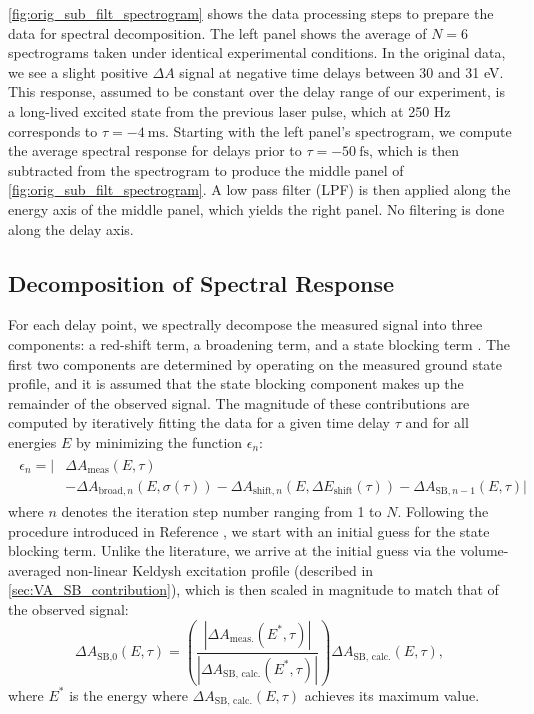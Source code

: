 \cref{fig:orig_sub_filt_spectrogram} shows the data processing steps to prepare the data for spectral decomposition. The left panel shows the average of $N=6$ spectrograms taken under identical experimental conditions. In the original data, we see a slight positive $\Delta A$ signal at negative time delays between 30 and 31 eV. This response, assumed to be constant over the delay range of our experiment, is a long-lived excited state from the previous laser pulse, which at 250 Hz corresponds to $\tau = - 4 \ \textrm{ms}$. Starting with the left panel's spectrogram, we compute the average spectral response for delays prior to $\tau = -50 \ \textrm{fs}$, which is then subtracted from the spectrogram to produce the middle panel of \cref{fig:orig_sub_filt_spectrogram}. A low pass filter (LPF) is then applied along the energy axis of the middle panel, which yields the right panel. No filtering is done along the delay axis.

\subsection{Decomposition of Spectral Response}

For each delay point, we spectrally decompose the measured signal into three components: a red-shift term, a broadening term, and a state blocking term \cite{zurchDirectSimultaneousObservation2017}. The first two components are determined by operating on the measured ground state profile, and it is assumed that the state blocking component makes up the remainder of the observed signal. The magnitude of these contributions are computed by iteratively fitting the data for a given time delay $\tau$ and for all energies $E$ by minimizing the function $\epsilon_n$:
\begin{align}
\begin{split}
\epsilon_n = \Big| & \Delta A_{\textrm{meas}}(E,\tau) \\
&- \Delta A_{\textrm{broad},n}(E,\sigma(\tau)) - \Delta A_{\textrm{shift},n}(E,\Delta E_{\textrm{shift}}(\tau)) - \Delta A_{\textrm{SB},n-1}(E,\tau) \Big|
\end{split}
\end{align}
where $n$ denotes the iteration step number ranging from 1 to $N$. Following the procedure introduced in Reference \cite{zurchDirectSimultaneousObservation2017}, we start with an initial guess for the state blocking term. Unlike the literature, we arrive at the initial guess via the volume-averaged non-linear Keldysh excitation profile (described in \cref{sec:VA_SB_contribution}), which is then scaled in magnitude to match that of the observed signal:
\begin{equation}
\Delta A_{\textrm{SB,0}}(E, \tau) = \left( \frac{|\Delta A_{\textrm{meas.}}(E^*, \tau)|}{|\Delta A_{\textrm{SB, calc.}}(E^*, \tau)|} \right) \Delta A_{\textrm{SB, calc.}}(E, \tau),
\end{equation}
where $E^*$ is the energy where $\Delta A_{\textrm{SB, calc.}}(E, \tau)$ achieves its maximum value.

